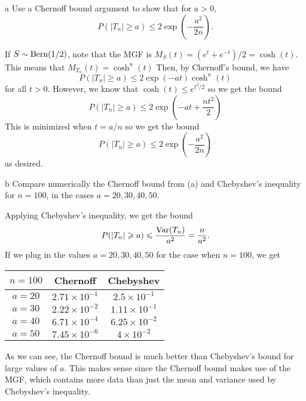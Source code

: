 \documentclass{pset}
\begin{document}
\begin{parts}
  \begin{part}{a}
    Use a Chernoff bound argument to show that for $a > 0$,
    \[
      P(|T_n| \geq a) \leq 2\exp\left(-\frac{a^2}{2n}\right).
    \]
  \end{part}

  If $S\sim \textrm{Bern}(1/2)$, note that the MGF is $M_S(t) = (e^t + e^{-t})/2 = \cosh(t)$. This means that $M_{T_n}(t)=\cosh^n(t)$ Then, by Chernoff's bound, we have
  \[
      P(|T_n| \geq a) \leq 2\exp(-at)\cosh^n(t)
  \]
  for all $t> 0$. However, we know that $\cosh(t) \leq e^{t^2/2}$ so we get the bound
  \[
    P(|T_n| \geq a) \leq 2\exp\left(-at + \frac{nt^2}{2}\right)
  \]
  This is minimized when $t=a/n$ so we get the bound
  \[
    P(|T_n|\geq a) \leq 2\exp\left(-\frac{a^2}{2n}\right)
  \]
  as desired.

  \begin{part}{b}
    Compare numerically the Chernoff bound from (a) and Chebyshev's inequality for $n=100$, in the cases $a=20,30,40,50$.
  \end{part}

  Applying Chebyshev's inequality, we get the bound
  \[
    P(|T_n| \geqslant a)\leqslant \frac{\textrm{Var}(T_n)}{a^2} = \frac{n}{a^2}.
  \]
  If we plug in the values $a=20,30,40,50$ for the case when $n=100$, we get
    \begin{center}
    {\renewcommand{\arraystretch}{1.1}
    \begin{tabular}{c|c|c}
        $n=100$ & Chernoff & Chebyshev \\ \hline
        $a=20$ & $2.71 \times 10^{-1}$ & $2.5 \times 10^{-1}$ \\
        $a=30$ & $2.22 \times 10^{-2}$ & $1.11 \times 10^{-1}$ \\
        $a=40$ & $6.71 \times 10^{-4}$ & $6.25 \times 10^{-2}$ \\
        $a=50$ & $7.45 \times 10^{-6}$ & $4 \times 10^{-2}$ \\
    \end{tabular}
    }
    \end{center}
  As we can see, the Chernoff bound is much better than Chebyshev's bound for large values of $a$. This makes sense since the Chernoff bound makes use of the MGF, which contains more data than just the mean and variance used by Chebyshev's inequality.
\end{parts}
\end{document}
